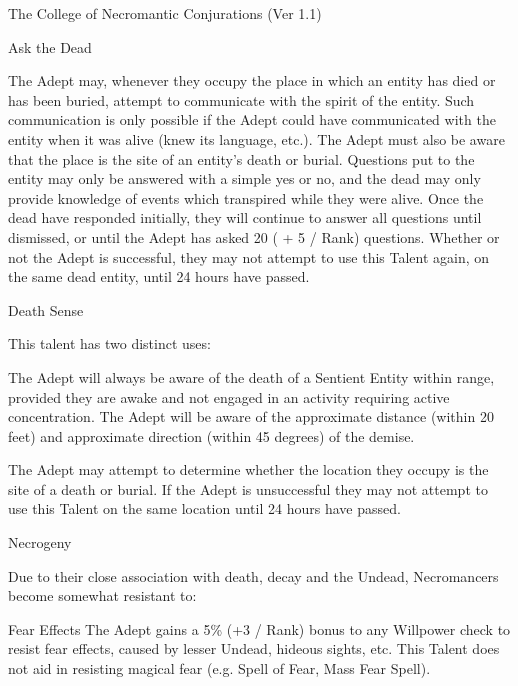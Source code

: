 \begin{Chapter}{The College of Necromantic Conjurations (Ver 1.1)}
\begin{talent}[T-1]{Ask the Dead}
\begin{effects}
The Adept may, whenever they occupy the place in which an entity has
died or has been buried, attempt to communicate with the spirit of the
entity.  Such communication is only possible if the Adept could have
communicated with the entity when it was alive (knew its language,
etc.).  The Adept must also be aware that the place is the site of an
entity’s death or burial. Questions put to the entity may only be
answered with a simple yes or no, and the dead may only provide
knowledge of events which transpired while they were alive.  Once the
dead have responded initially, they will continue to answer all
questions until dismissed, or until the Adept has asked 20 ( + 5 /
Rank) questions. Whether or not the Adept is successful, they may not
attempt to use this Talent again, on the same dead entity, until 24
hours have passed.
\end{effects}
\end{talent}

\begin{talent}[T-2]{Death Sense}
\begin{effects}
This talent has two distinct uses: 
\begin{Enumerate}
\item The Adept will always be aware of the death of a Sentient Entity
  within range, provided they are awake and not engaged in an activity
  requiring active concentration.  The Adept will be aware of the
  approximate distance (within 20 feet) and approximate direction
  (within 45 degrees) of the demise.

\item The Adept may attempt to determine whether the location they
  occupy is the site of a death or burial.  If the Adept is
  unsuccessful they may not attempt to use this Talent on the same
  location until 24 hours have passed.
\end{Enumerate}
\end{effects}
\end{talent}

\begin{talent}[T-3]{Necrogeny}

\begin{effects}
Due to their close association with death, decay and the Undead,
Necromancers become somewhat resistant to:
\begin{Description}
\item[Fear Effects] The Adept gains a 5\% (+3 / Rank) bonus to any
  Willpower check to resist fear effects, caused by lesser Undead,
  hideous sights, etc.  This Talent does not aid in resisting magical
  fear (e.g.  Spell of Fear, Mass Fear Spell).


\end{Description}
\end{effects}
\end{talent}
\end{Chapter}
